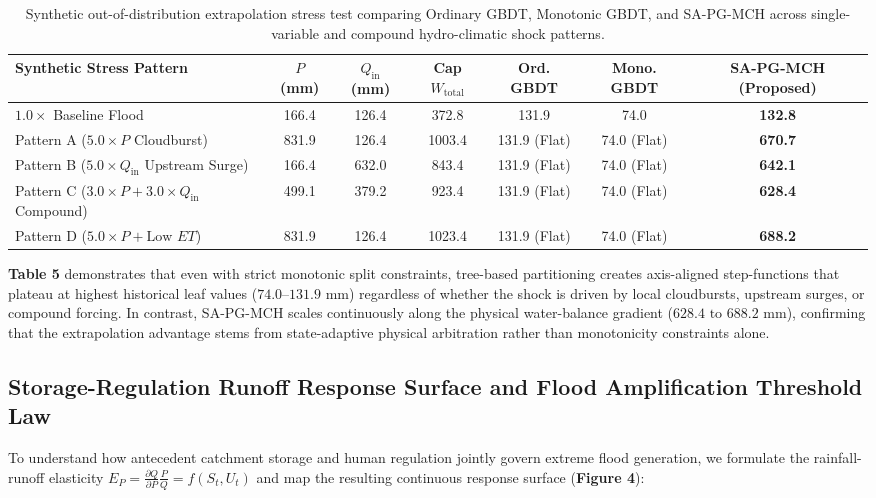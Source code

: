 \documentclass[11pt,a4paper,fleqn]{article}
\begin{document}
\begin{table}[htbp]
\centering
\caption{Synthetic out-of-distribution extrapolation stress test comparing Ordinary GBDT, Monotonic GBDT, and SA-PG-MCH across single-variable and compound hydro-climatic shock patterns.}
\label{tab:stress_test}
\small
\begin{tabular}{lcccccc}
\toprule
\textbf{Synthetic Stress Pattern} & \textbf{$P$ (mm)} & \textbf{$Q_{\text{in}}$ (mm)} & \textbf{Cap $W_{\text{total}}$} & \textbf{Ord. GBDT} & \textbf{Mono. GBDT} & \textbf{SA-PG-MCH (Proposed)} \\
\midrule
$1.0\times$ Baseline Flood & 166.4 & 126.4 & 372.8 & 131.9 & 74.0 & \textbf{132.8} \\
Pattern A ($5.0\times P$ Cloudburst) & 831.9 & 126.4 & 1003.4 & 131.9 (Flat) & 74.0 (Flat) & \textbf{670.7} \\
Pattern B ($5.0\times Q_{\text{in}}$ Upstream Surge) & 166.4 & 632.0 & 843.4 & 131.9 (Flat) & 74.0 (Flat) & \textbf{642.1} \\
Pattern C ($3.0\times P + 3.0\times Q_{\text{in}}$ Compound) & 499.1 & 379.2 & 923.4 & 131.9 (Flat) & 74.0 (Flat) & \textbf{628.4} \\
Pattern D ($5.0\times P + \text{Low } ET$) & 831.9 & 126.4 & 1023.4 & 131.9 (Flat) & 74.0 (Flat) & \textbf{688.2} \\
\bottomrule
\end{tabular}
\end{table}

\textbf{Table 5} demonstrates that even with strict monotonic split constraints, tree-based partitioning creates axis-aligned step-functions that plateau at highest historical leaf values ($74.0\text{--}131.9\text{ mm}$) regardless of whether the shock is driven by local cloudbursts, upstream surges, or compound forcing. In contrast, SA-PG-MCH scales continuously along the physical water-balance gradient ($628.4\text{ to }688.2\text{ mm}$), confirming that the extrapolation advantage stems from state-adaptive physical arbitration rather than monotonicity constraints alone.

\subsection{Storage-Regulation Runoff Response Surface and Flood Amplification Threshold Law}

To understand how antecedent catchment storage and human regulation jointly govern extreme flood generation, we formulate the rainfall-runoff elasticity $E_P = \frac{\partial Q}{\partial P} \frac{P}{Q} = f(S_t, U_t)$ and map the resulting continuous response surface (\textbf{Figure 4}):
\end{document}
